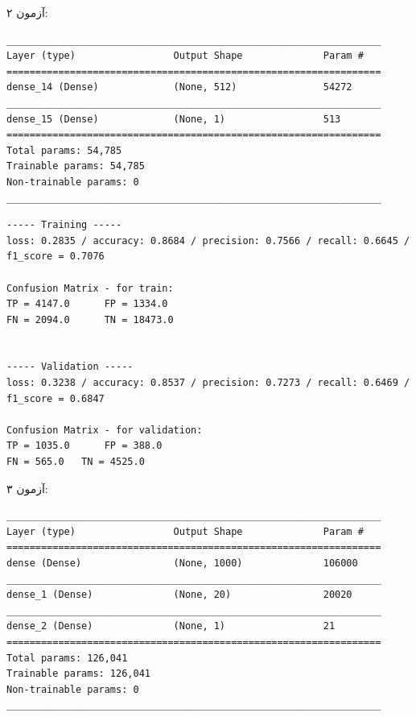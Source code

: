 \documentclass{article}
\begin{document}
\bigbreak

آزمون ۲:

\begin{latin}
\begin{lstlisting}
_________________________________________________________________
Layer (type)                 Output Shape              Param #   
=================================================================
dense_14 (Dense)             (None, 512)               54272     
_________________________________________________________________
dense_15 (Dense)             (None, 1)                 513       
=================================================================
Total params: 54,785
Trainable params: 54,785
Non-trainable params: 0
_________________________________________________________________
\end{lstlisting}
\end{latin}

\begin{latin}
\begin{lstlisting}
----- Training -----
loss: 0.2835 / accuracy: 0.8684 / precision: 0.7566 / recall: 0.6645 /
f1_score = 0.7076

Confusion Matrix - for train:
TP = 4147.0 	 FP = 1334.0
FN = 2094.0 	 TN = 18473.0


----- Validation -----
loss: 0.3238 / accuracy: 0.8537 / precision: 0.7273 / recall: 0.6469 / 
f1_score = 0.6847

Confusion Matrix - for validation:
TP = 1035.0 	 FP = 388.0
FN = 565.0 	 TN = 4525.0
\end{lstlisting}
\end{latin}

\bigbreak


آزمون ۳:

\begin{latin}
\begin{lstlisting}
_________________________________________________________________
Layer (type)                 Output Shape              Param #   
=================================================================
dense (Dense)                (None, 1000)              106000    
_________________________________________________________________
dense_1 (Dense)              (None, 20)                20020     
_________________________________________________________________
dense_2 (Dense)              (None, 1)                 21        
=================================================================
Total params: 126,041
Trainable params: 126,041
Non-trainable params: 0
_________________________________________________________________
\end{lstlisting}
\end{latin}
\end{document}
